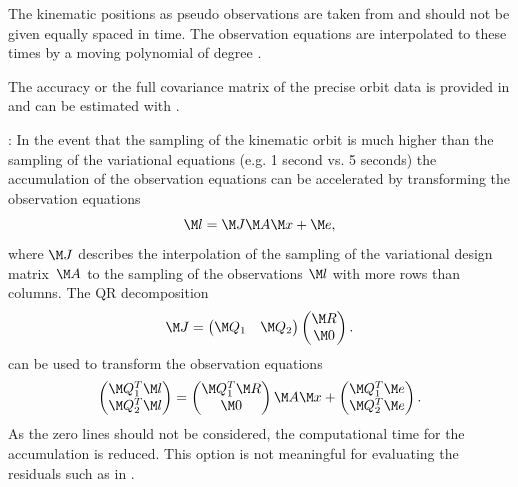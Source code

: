 The kinematic positions as pseudo observations are taken from
 and should not be given equally spaced in time. The observation
equations are interpolated to these times by a moving polynomial of degree .

The accuracy or the full covariance matrix of the precise orbit data is provided in
 and can be estimated with .

: In the event that the sampling of the kinematic orbit is much higher than the sampling
of the variational equations (e.g. 1 second vs. 5 seconds) the accumulation of the observation equations
can be accelerated by transforming the observation equations
\begin{equation}
  \M l = \M J \M A \M x + \M e,
\end{equation}
where $\M J$ describes the interpolation of the sampling of the variational design matrix~$\M A$
to the sampling of the observations $\M l$ with more rows than columns. The QR decomposition
\begin{equation}
  \M J = \begin{pmatrix} \M Q_1 & \M Q_2 \end{pmatrix}
         \begin{pmatrix} \M R \\ \M 0 \end{pmatrix}.
\end{equation}
can be used to transform the observation equations
\begin{equation}
  \begin{pmatrix} \M Q_1^T \M l \\ \M Q_2^T \M l \end{pmatrix} =
  \begin{pmatrix} \M Q_1^T \M R \\ \M 0 \end{pmatrix} \M A \M x +
  \begin{pmatrix} \M Q_1^T \M e \\ \M Q_2^T \M e \end{pmatrix}.
\end{equation}
As the zero lines should not be considered, the computational time for the accumulation is reduced.
This option is not meaningful for evaluating the residuals such as in .

